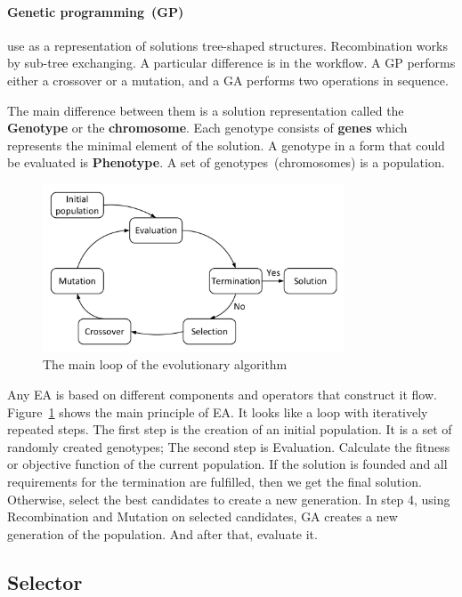 \paragraph{Genetic programming~(GP)} use as a representation of solutions tree-shaped structures. Recombination works by sub-tree exchanging. A particular difference is in the workflow. A GP performs either a crossover or a mutation, and a GA performs two operations in sequence.

The main difference between them is a solution representation called the \textbf{Genotype} or the \textbf{chromosome}. Each genotype consists of \textbf{genes} which represents the minimal element of the solution. A genotype in a form that could be evaluated is \textbf{Phenotype}. A set of genotypes~(chromosomes) is a population.

\begin{figure}
	\centering
	\includegraphics[width=0.8\textwidth]{images/GeneticLoop.pdf}
	\caption[The main loop of the evolutionary algorithm]{The main loop of the evolutionary algorithm}
	\label{fig:GeneticLoop}
\end{figure}

Any EA is based on different components and operators that construct it flow.
Figure~\ref{fig:GeneticLoop} shows the main principle of EA. It looks like a loop with iteratively repeated steps.
The first step is the creation of an initial population. It is a set of randomly created genotypes;
The second step is Evaluation. Calculate the fitness or objective function of the current population.
If the solution is founded and all requirements for the termination are fulfilled, then we get the final solution. Otherwise, select the best candidates to create a new generation.
In step 4, using Recombination and Mutation on selected candidates, GA creates a new generation of the population. And after that, evaluate it.

\subsection{Selector}\label{sec:GeneticAlgorithm:Selector}

